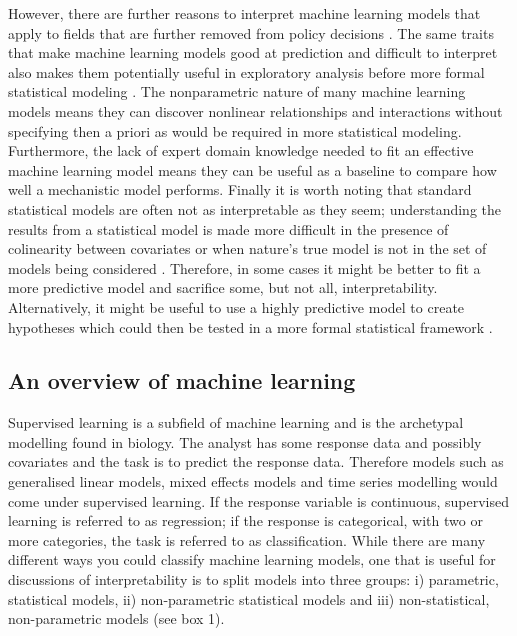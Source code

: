\documentclass[10pt,]{article}
\begin{document}
However, there are further reasons to interpret machine learning models that apply to fields that are further removed from policy decisions \citep{elith2009species}. The same traits that make machine learning models good at prediction and difficult to interpret also makes them potentially useful in exploratory analysis before more formal statistical modeling \citep{zhao2017causal}. The nonparametric nature of many machine learning models means they can discover nonlinear relationships and interactions without specifying then a priori as would be required in more statistical modeling. Furthermore, the lack of expert domain knowledge needed to fit an effective machine learning model means they can be useful as a baseline to compare how well a mechanistic model performs. Finally it is worth noting that standard statistical models are often not as interpretable as they seem; understanding the results from a statistical model is made more difficult in the presence of colinearity between covariates or when nature's true model is not in the set of models being considered \citep{lyddon2018nonparametric, yao2017using}. Therefore, in some cases it might be better to fit a more predictive model and sacrifice some, but not all, interpretability. Alternatively, it might be useful to use a highly predictive model to create hypotheses which could then be tested in a more formal statistical framework \citep{zhao2017causal}.

\subsection{An overview of machine learning}\label{an-overview-of-machine-learning}

Supervised learning is a subfield of machine learning and is the archetypal modelling found in biology. The analyst has some response data and possibly covariates and the task is to predict the response data. Therefore models such as generalised linear models, mixed effects models and time series modelling would come under supervised learning. If the response variable is continuous, supervised learning is referred to as regression; if the response is categorical, with two or more categories, the task is referred to as classification. While there are many different ways you could classify machine learning models, one that is useful for discussions of interpretability is to split models into three groups: i) parametric, statistical models, ii) non-parametric statistical models and iii) non-statistical, non-parametric models (see box 1).
\end{document}
